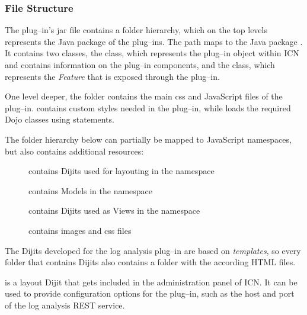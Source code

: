 \subsubsection*{File Structure}
The plug--in's \ac{jar} file contains a folder hierarchy, which on the top levels represents the Java package of the plug--ins. The path  maps to the Java package . It contains two classes, the  class, which represents the plug--in object within ICN and contains information on the plug--in components, and the  class, which represents the \emph{Feature} that is exposed through the plug--in.

One level deeper, the  folder contains the main \ac{css} and JavaScript files of the plug--in.  contains custom styles needed in the plug--in, while  loads the required Dojo classes using  statements.

The folder hierarchy below  can partially be mapped to JavaScript namespaces, but also contains additional resources:
\begin{description}
	\item[] contains Dijits used for layouting in the  namespace
	\item[] contains Models in the  namespace
	\item[] contains Dijits used as Views in the  namespace
	\item[] contains images and \ac{css} files
\end{description}
The Dijits developed for the log analysis plug--in are based on \emph{\glspl{template}}, so every folder that contains Dijits also contains a  folder with the according HTML files.

 is a layout Dijit that gets included in the administration panel of ICN. It can be used to provide configuration options for the plug--in, such as the host and port of the log analysis REST service.

